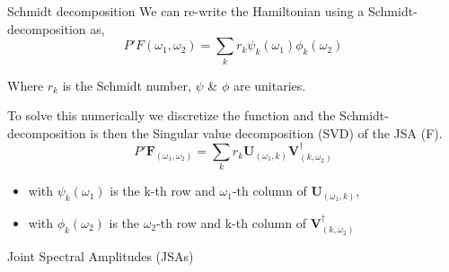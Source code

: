 \documentclass{beamer}
\begin{document}
\begin{frame}{Schmidt decomposition}
    We can re-write the Hamiltonian using a Schmidt-decomposition \cite{lvovsky2007decomposing}as,
    \begin{equation}
    P' F(\omega_1,\omega_2) = \sum_k r_k \psi_k(\omega_1) \phi_k(\omega_2)
    \end{equation}

    Where $r_k$ is the Schmidt number, $ \psi $ \& $\phi $ are unitaries.\newline

    To solve this numerically we discretize the function and the Schmidt-decomposition is then the Singular value decomposition (SVD) of the JSA (F).
    \begin{equation}
        P' \textbf{F}_{(\omega_1, \omega_2)} = \sum_k r_k \textbf{U}_{(\omega_1, k)} \textbf{V}_{(k, \omega_2)}^\dagger
    \end{equation}
    \begin{itemize}
        \item with $ \psi_k(\omega_1) $ is the k-th row and $\omega_1$-th column of $\textbf{U}_{(\omega_1, k)}$,
        \item with $ \phi_k(\omega_2) $ is the $\omega_2$-th row and k-th column of $\textbf{V}^\dagger_{(k,\omega_2)}$
    \end{itemize}
\end{frame}

\begin{frame}{Joint Spectral Amplitudes (JSAs)} 
    \centering
        \begin{figure}
        \end{figure}
    \end{frame}
\end{document}
